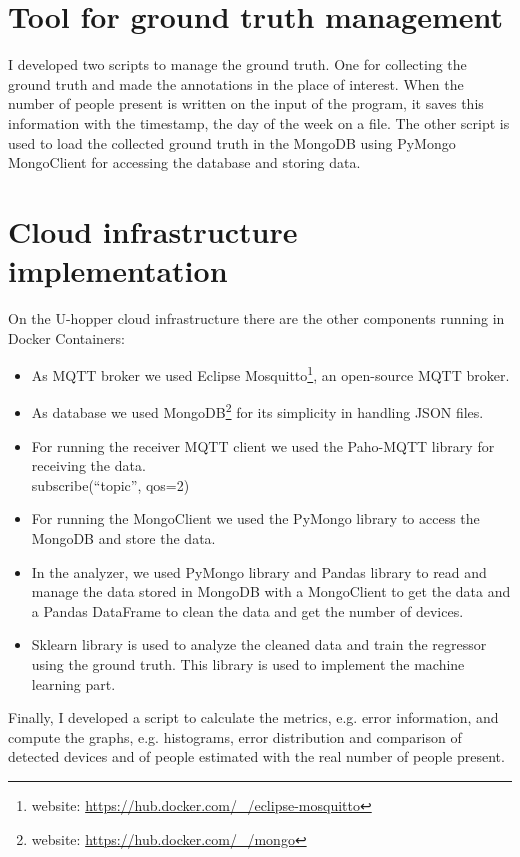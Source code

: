


\section{Tool for ground truth management}
\label{sec:toolgt}
\vspace{0.2 cm} 

I developed two scripts to manage the ground truth. One for collecting the ground truth and made the annotations in the place of interest. When the number of people present is written on the input of the program, it saves this information with the timestamp, the day of the week on a file.
The other script is used to load the collected ground truth in the MongoDB using PyMongo MongoClient for accessing the database and storing data.


\section{Cloud infrastructure implementation}
\label{sec:cloudinfrastructure}
\vspace{0.2 cm} 

On the U-hopper cloud infrastructure there are the other components running in Docker Containers:
\begin{itemize}
  \item As MQTT broker we used Eclipse Mosquitto\footnote{ website: \url{https://hub.docker.com/_/eclipse-mosquitto} }, an open-source MQTT broker.
  \item As database we used MongoDB\footnote{ website: \url{https://hub.docker.com/_/mongo} } for its simplicity in handling JSON files.
  \item For running the receiver MQTT client we used the Paho-MQTT library for receiving the data.\\subscribe(``topic'', qos=2)
  \item For running the MongoClient we used the PyMongo library to access the MongoDB and store the data.
  \item In the analyzer, we used PyMongo library and Pandas library to read and manage the data stored in MongoDB with a MongoClient to get the data and a Pandas DataFrame to clean the data and get the number of devices.
  \item Sklearn library is used to analyze the cleaned data and train the regressor using the ground truth. This library is used to implement the machine learning part.
\end{itemize}

Finally, I developed a script to calculate the metrics, e.g. error information, and compute the graphs, e.g. histograms, error distribution and comparison of detected devices and of people estimated with the real number of people present.
